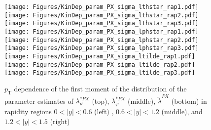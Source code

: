 \documentclass[12pt]{article}
\newcommand{\pT}{p_\mathrm{T}}
\newcommand{\absy}{\left |  y \right |}
\newcommand{\lamtildePX}{\tilde{\lambda}^{\scriptscriptstyle PX}}
\newcommand{\lamthstarPX}{\lambda^{* \scriptscriptstyle PX}_\vartheta}
\newcommand{\lamphstarPX}{\lambda^{* \scriptscriptstyle PX}_\varphi}
\begin{document}
\begin{figure}[htbp]
\centering
\texttt{[image: Figures/KinDep\_param\_PX\_sigma\_lthstar\_rap1.pdf]}
\texttt{[image: Figures/KinDep\_param\_PX\_sigma\_lthstar\_rap2.pdf]}
\texttt{[image: Figures/KinDep\_param\_PX\_sigma\_lthstar\_rap3.pdf]}
\texttt{[image: Figures/KinDep\_param\_PX\_sigma\_lphstar\_rap1.pdf]}
\texttt{[image: Figures/KinDep\_param\_PX\_sigma\_lphstar\_rap2.pdf]}
\texttt{[image: Figures/KinDep\_param\_PX\_sigma\_lphstar\_rap3.pdf]}
\texttt{[image: Figures/KinDep\_param\_PX\_sigma\_ltilde\_rap1.pdf]}
\texttt{[image: Figures/KinDep\_param\_PX\_sigma\_ltilde\_rap2.pdf]}
\texttt{[image: Figures/KinDep\_param\_PX\_sigma\_ltilde\_rap3.pdf]}
\caption{$\pT$ dependence of the first moment of the distribution of the parameter estimates of $\lamthstarPX$ (top), $\lamphstarPX$ (middle), $\lamtildePX$ (bottom) in rapidity regions $0<\absy<0.6$ (left) , $0.6<\absy<1.2$ (middle), and $1.2<\absy<1.5$ (right)}
\end{figure}
\clearpage
\end{document}
